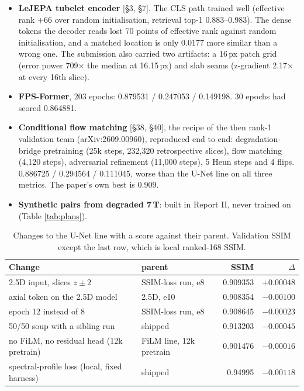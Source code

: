 \documentclass[10pt,a4paper]{article}
\begin{document}
\begin{itemize}
  \item \textbf{LeJEPA tubelet encoder} [\S3, \S7]. The CLS path trained well (effective rank
        $+66$ over random initialisation, retrieval top-1 0.883--0.983). The dense tokens the
        decoder reads lost 70 points of effective rank against random initialisation, and a
        matched location is only 0.0177 more similar than a wrong one. The submission also
        carried two artifacts: a 16\,px patch grid (error power 709$\times$ the median at
        16.15\,px) and slab seams (z-gradient 2.17$\times$ at every 16th slice).
  \item \textbf{FPS-Former}, 203 epochs: 0.879531 / 0.247053 / 0.149198. 30 epochs had scored
        0.864881.
  \item \textbf{Conditional flow matching} [\S38, \S40], the recipe of the then rank-1
        validation team (arXiv:2609.00960), reproduced end to end: degradation-bridge
        pretraining (25k steps, 232{,}320 retrospective slices), flow matching (4{,}120 steps),
        adversarial refinement (11{,}000 steps), 5 Heun steps and 4 flips. 0.886725 / 0.294564 /
        0.111045, worse than the U-Net line on all three metrics. The paper's own best is 0.909.
  \item \textbf{Synthetic pairs from degraded 7\,T}: built in Report II, never trained on (Table
        \ref{tab:plans}).
\end{itemize}

\begin{table}[H]
\centering\small
\begin{tabular}{llrr}
\toprule
Change & parent & SSIM & $\Delta$ \\
\midrule
2.5D input, slices $z\pm2$            & SSIM-loss run, e8      & 0.909353 & $+0.00048$ \\
axial token on the 2.5D model          & 2.5D, e10              & 0.908354 & $-0.00100$ \\
epoch 12 instead of 8                  & SSIM-loss run, e8      & 0.908645 & $-0.00023$ \\
50/50 soup with a sibling run          & shipped                & 0.913203 & $-0.00045$ \\
no FiLM, no residual head (12k pretrain) & FiLM line, 12k pretrain & 0.901476 & $-0.00016$ \\
spectral-profile loss (local, fixed harness) & shipped        & 0.94995  & $-0.00118$ \\
\bottomrule
\end{tabular}
\caption{Changes to the U-Net line with a score against their parent. Validation SSIM except the
last row, which is local ranked-168 SSIM.}
\label{tab:changes}
\end{table}
\end{document}

